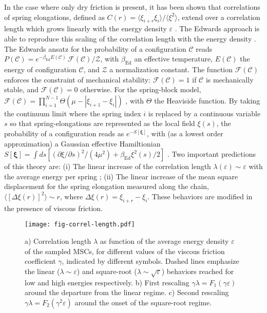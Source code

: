 \documentclass[prl,twocolumn,floats,floatfix,aps,superscriptaddress,showpacs]{revtex4-1}
\newcommand{\mC}{\mathcal{C}}
\newcommand{\Bed}{\beta_{\textrm{Ed}}}
\newcommand{\ve}{\varepsilon}
\begin{document}
In the case where only dry friction is present, it has been shown that 
correlations of spring elongations, defined as $C(r)=\langle
\xi_{i+r}\xi_i \rangle/\langle \xi^2 \rangle$, extend over a correlation length which grows linearly with the energy density $\ve$ \cite{Gradenigo15}.
The Edwards approach is able to reproduce this scaling
of the correlation length with the energy density \cite{Gradenigo15}.
The Edwards ansatz for the probability of a configuration $\mC$ reads 
$P(\mC) = e^{-\Bed E(\mC)}\, \mathcal{F}(\mC)/\mathcal{Z}$, with 
$\Bed$ an effective temperature, $E(\mC)$
the energy of configuration $\mC$, and $\mathcal{Z}$ a normalization constant.
The function $\mathcal{F}(\mC)$ enforces the constraint of mechanical stability:
$\mathcal{F}(\mC)=1$ if $\mC$ is mechanically stable, and $\mathcal{F}(\mC)=0$
otherwise.
For the spring-block model, $\mathcal{F}(\mC) = \prod_{i=1}^{N-1}
\Theta(\mu-|\xi_{i+1}-\xi_i|)$ \cite{Gradenigo15}, with $\Theta$ the Heaviside function. 
By taking the continuum limit where the spring index $i$ is replaced by a continuous variable $s$ so that spring-elongations are represented as the local field $\xi(s)$, the
probability of a configuration reads as $e^{-S[{\bm \xi}]}$, with
(as a lowest order approximation)
a Gaussian effective Hamiltionian $ S[{\bm \xi}] = \int ds
[(\partial \xi /\partial s)^2/(4\mu^2) + \Bed\xi^2(s)/2]$ \cite{Gradenigo15}. 
Two important predictions of this theory are:
(i) The linear increase of the
correlation length $\lambda(\ve) \sim \ve$ with the average energy per
spring \cite{Gradenigo15};
(ii) The linear increase of the mean square displacement for the spring
elongation measured along the chain, $\langle[\Delta \xi(r)]^2\rangle
\sim r $, where $\Delta \xi(r) = \xi_{i+r}-\xi_i$.
These behaviors are modified in the presence of viscous friction.
%
%
\begin{figure}[t!]
  \texttt{[image: fig-correl-length.pdf]}
\caption{a) Correlation length $\lambda$ as function of the average energy 
density $\ve$ of the sampled MSCs, for different values of the viscous
friction coefficient $\gamma$, indicated by different symbols.
Dashed lines emphasize the linear ($\lambda \sim \ve$) and square-root
($\lambda \sim \sqrt{\ve}$) behaviors reached for low and high energies respectively. b) First rescaling $\gamma \lambda = F_1(\gamma \ve)$ around the departure from the linear regime.
c) Second rescaling $\gamma \lambda = F_2(\gamma^2 \ve)$ around the
onset of the square-root regime.}
\label{fig-correl-length}
\end{figure}
\end{document}
